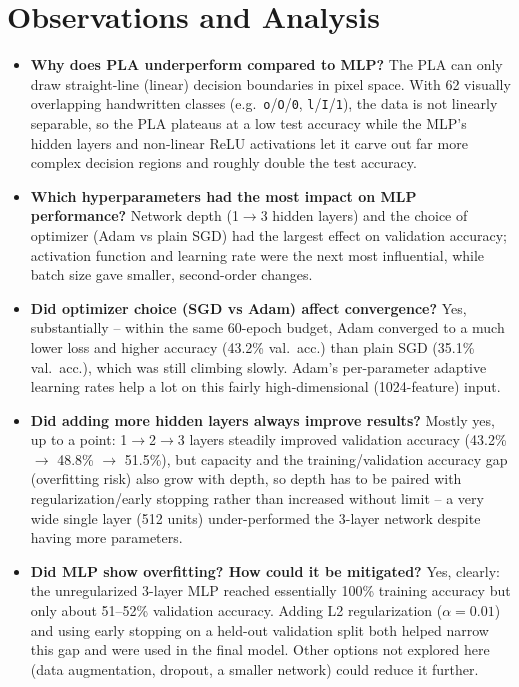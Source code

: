 \documentclass[12pt,a4paper]{article}
\begin{document}
\section{Observations and Analysis}
\begin{itemize}
\item \textbf{Why does PLA underperform compared to MLP?} The PLA can only draw straight-line
(linear) decision boundaries in pixel space. With 62 visually overlapping handwritten classes
(e.g.\ \texttt{o}/\texttt{O}/\texttt{0}, \texttt{l}/\texttt{I}/\texttt{1}), the data is not linearly
separable, so the PLA plateaus at a low test accuracy while the MLP's hidden layers and non-linear
ReLU activations let it carve out far more complex decision regions and roughly double the test
accuracy.
\item \textbf{Which hyperparameters had the most impact on MLP performance?} Network depth
(1$\to$3 hidden layers) and the choice of optimizer (Adam vs plain SGD) had the largest effect on
validation accuracy; activation function and learning rate were the next most influential, while
batch size gave smaller, second-order changes.
\item \textbf{Did optimizer choice (SGD vs Adam) affect convergence?} Yes, substantially -- within
the same 60-epoch budget, Adam converged to a much lower loss and higher accuracy (43.2\% val.\ acc.)
than plain SGD (35.1\% val.\ acc.), which was still climbing slowly. Adam's per-parameter adaptive
learning rates help a lot on this fairly high-dimensional (1024-feature) input.
\item \textbf{Did adding more hidden layers always improve results?} Mostly yes, up to a point:
1$\to$2$\to$3 layers steadily improved validation accuracy (43.2\% $\to$ 48.8\% $\to$ 51.5\%), but
capacity and the training/validation accuracy gap (overfitting risk) also grow with depth, so depth
has to be paired with regularization/early stopping rather than increased without limit -- a very
wide single layer (512 units) under-performed the 3-layer network despite having more parameters.
\item \textbf{Did MLP show overfitting? How could it be mitigated?} Yes, clearly: the unregularized
3-layer MLP reached essentially 100\% training accuracy but only about 51--52\% validation accuracy.
Adding L2 regularization ($\alpha=0.01$) and using early stopping on a held-out validation split both
helped narrow this gap and were used in the final model. Other options not explored here (data
augmentation, dropout, a smaller network) could reduce it further.
\end{itemize}
\end{document}
